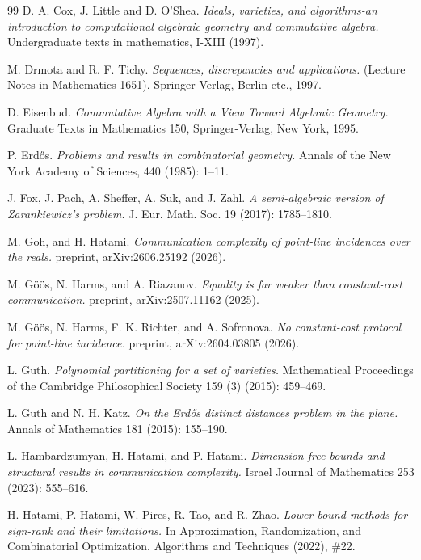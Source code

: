 \documentclass[11pt]{article}
\theoremstyle{plain}
\theoremstyle{definition}
\begin{document}
\begin{thebibliography}{99}
		D. A. Cox, J. Little and D. O'Shea.
		\emph{Ideals, varieties, and algorithms-an introduction to computational algebraic geometry and commutative algebra.}
		Undergraduate texts in mathematics, I-XIII (1997).
		
		M. Drmota and R. F. Tichy.
		\emph{Sequences, discrepancies and applications.}
		(Lecture Notes in Mathematics 1651). Springer-Verlag, Berlin etc., 1997.

        D. Eisenbud.
        \emph{Commutative Algebra with a View Toward Algebraic Geometry.}
        Graduate Texts in Mathematics 150, Springer-Verlag, New York, 1995.
		
		P. Erd\H{o}s. \emph{Problems and results in combinatorial geometry.}
		Annals of the New York Academy of Sciences, 440 (1985): 1--11.
		
		J. Fox, J. Pach, A. Sheffer, A. Suk, and J. Zahl. 
		\emph{A semi-algebraic version of Zarankiewicz's problem.}
		J. Eur. Math. Soc. 19 (2017): 1785--1810.
		
		M. Goh, and H. Hatami.
		\emph{Communication complexity of point-line incidences over the reals.}
		preprint, arXiv:2606.25192 (2026).

		M. G\"o\"os, N. Harms, and A. Riazanov.
		\emph{Equality is far weaker than constant-cost communication.}
		preprint, arXiv:2507.11162 (2025).
        
		M. G\"o\"os, N. Harms, F. K. Richter, and A. Sofronova. 
		\emph{No constant-cost protocol for point-line incidence.}
		preprint, arXiv:2604.03805 (2026).
		
		
		L. Guth.
		\emph{Polynomial partitioning for a set of varieties.}
		Mathematical Proceedings of the Cambridge Philosophical Society 159 (3) (2015): 459--469.
		
		L. Guth and N. H. Katz. 
		\emph{On the Erd\H{o}s distinct distances problem in the plane.}
		Annals of Mathematics 181 (2015): 155--190.
		
		L. Hambardzumyan, H. Hatami, and P. Hatami. 
		\emph{Dimension-free bounds and structural results in communication complexity.} Israel Journal of Mathematics 253 (2023): 555--616.
		
		H. Hatami, P. Hatami, W. Pires, R. Tao, and R. Zhao. 
		\emph{Lower bound methods for sign-rank and their limitations.}
		In Approximation, Randomization, and Combinatorial Optimization. Algorithms and Techniques (2022), \#22.


\end{thebibliography}
\end{document}
